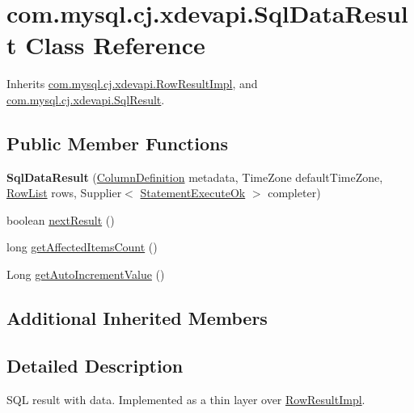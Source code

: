 \hypertarget{classcom_1_1mysql_1_1cj_1_1xdevapi_1_1_sql_data_result}{}\section{com.\+mysql.\+cj.\+xdevapi.\+Sql\+Data\+Result Class Reference}
\label{classcom_1_1mysql_1_1cj_1_1xdevapi_1_1_sql_data_result}


Inherits \mbox{\hyperlink{classcom_1_1mysql_1_1cj_1_1xdevapi_1_1_row_result_impl}{com.\+mysql.\+cj.\+xdevapi.\+Row\+Result\+Impl}}, and \mbox{\hyperlink{interfacecom_1_1mysql_1_1cj_1_1xdevapi_1_1_sql_result}{com.\+mysql.\+cj.\+xdevapi.\+Sql\+Result}}.

\subsection*{Public Member Functions}
\begin{DoxyCompactItemize}
\item 
\mbox{\label{classcom_1_1mysql_1_1cj_1_1xdevapi_1_1_sql_data_result_a093eac6f7bdb99d8f0130150171231dc}} 
{\bfseries Sql\+Data\+Result} (\mbox{\hyperlink{interfacecom_1_1mysql_1_1cj_1_1protocol_1_1_column_definition}{Column\+Definition}} metadata, Time\+Zone default\+Time\+Zone, \mbox{\hyperlink{interfacecom_1_1mysql_1_1cj_1_1result_1_1_row_list}{Row\+List}} rows, Supplier$<$ \mbox{\hyperlink{classcom_1_1mysql_1_1cj_1_1protocol_1_1x_1_1_statement_execute_ok}{Statement\+Execute\+Ok}} $>$ completer)
\item 
boolean \mbox{\hyperlink{classcom_1_1mysql_1_1cj_1_1xdevapi_1_1_sql_data_result_a4dc2d012228a58a9ebe74f93f9a007a9}{next\+Result}} ()
\item 
long \mbox{\hyperlink{classcom_1_1mysql_1_1cj_1_1xdevapi_1_1_sql_data_result_a84d9f2a000e9babce642708126dbb124}{get\+Affected\+Items\+Count}} ()
\item 
Long \mbox{\hyperlink{classcom_1_1mysql_1_1cj_1_1xdevapi_1_1_sql_data_result_aa6d3e3de7bb565c7086d71b0242c77d9}{get\+Auto\+Increment\+Value}} ()
\end{DoxyCompactItemize}
\subsection*{Additional Inherited Members}


\subsection{Detailed Description}
S\+QL result with data. Implemented as a thin layer over \mbox{\hyperlink{classcom_1_1mysql_1_1cj_1_1xdevapi_1_1_row_result_impl}{Row\+Result\+Impl}}. 

